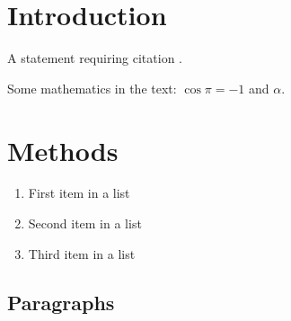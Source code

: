 \documentclass[
    10pt, %
    a4paper, %
    oneside, %
    headinclude,footinclude, %
    BCOR5mm, %
]{scrartcl}
\begin{document}
    \let\thefootnote\relax{}

    \let\thefootnote\relax{}


    \newpage %



    \section{Introduction}

    A statement requiring citation \cite{Figueredo:2009dg}.

    \lipsum[1-3] %

    Some mathematics in the text: $\cos\pi=-1$ and $\alpha$.



    \section{Methods}

    \lipsum[5] %

    \begin{enumerate}[noitemsep] %
        \item First item in a list
        \item Second item in a list
        \item Third item in a list
    \end{enumerate}


    \subsection{Paragraphs}
\end{document}
